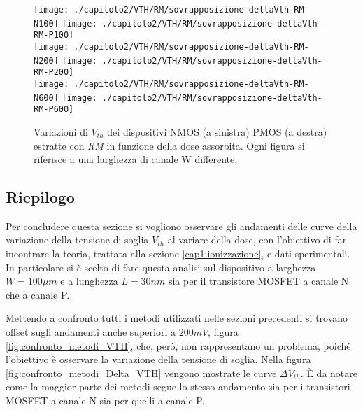 \clearpage

\begin{figure}[ht]
  \centering
  \texttt{[image: ./capitolo2/VTH/RM/sovrapposizione-deltaVth-RM-N100]}
  \texttt{[image: ./capitolo2/VTH/RM/sovrapposizione-deltaVth-RM-P100]}\\
  \vspace{0.2cm}
  \texttt{[image: ./capitolo2/VTH/RM/sovrapposizione-deltaVth-RM-N200]}
  \texttt{[image: ./capitolo2/VTH/RM/sovrapposizione-deltaVth-RM-P200]}\\
  \vspace{0.2cm}
  \texttt{[image: ./capitolo2/VTH/RM/sovrapposizione-deltaVth-RM-N600]}
  \texttt{[image: ./capitolo2/VTH/RM/sovrapposizione-deltaVth-RM-P600]}
  \caption[Dati $\Delta V_{th}$ estratti con RM]{Variazioni di $V_{th}$ dei dispositivi NMOS (a sinistra) PMOS (a destra) estratte con \emph{RM} in funzione della dose assorbita. Ogni figura si riferisce a una larghezza di canale W differente.}
  \label{fig:DeltaVthRM}
\end{figure}

\FloatBarrier

\subsection{Riepilogo}
Per concludere questa sezione si vogliono osservare gli andamenti delle curve della variazione della tensione di soglia $V_{th}$ al variare della dose, con l'obiettivo di far incontrare la teoria, trattata alla sezione \ref{cap1:ionizzazione}, e dati sperimentali.
In particolare si è scelto di fare questa analisi sul dispositivo a larghezza $W = 100 \mu m$ e a lunghezza $L = 30 nm$ sia per il transistore MOSFET a canale N che a canale P. 

Mettendo a confronto tutti i metodi utilizzati nelle sezioni precedenti si trovano offset sugli andamenti anche superiori a $200mV$, figura \ref{fig:confronto_metodi_VTH}, che, però, non rappresentano un problema, poiché l'obiettivo è osservare la variazione della tensione di soglia. Nella figura \ref{fig:confronto_metodi_Delta_VTH} vengono mostrate le curve $\Delta V_{th}$. È da notare come la maggior parte dei metodi segue lo stesso andamento sia per i transistori MOSFET a canale N sia per quelli a canale P.

